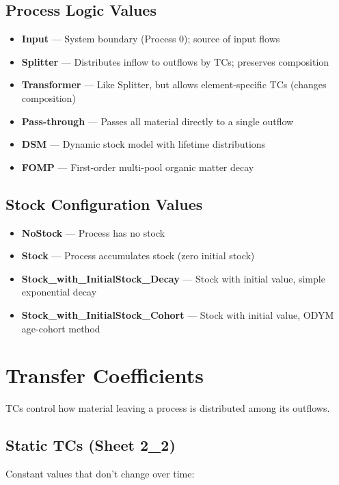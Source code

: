 \subsection{Process Logic Values}

\begin{itemize}
  \item \textbf{Input} --- System boundary (Process 0); source of input flows
  \item \textbf{Splitter} --- Distributes inflow to outflows by TCs; preserves composition
  \item \textbf{Transformer} --- Like Splitter, but allows element-specific TCs (changes composition)
  \item \textbf{Pass-through} --- Passes all material directly to a single outflow
  \item \textbf{DSM} --- Dynamic stock model with lifetime distributions
  \item \textbf{FOMP} --- First-order multi-pool organic matter decay
\end{itemize}

\subsection{Stock Configuration Values}

\begin{itemize}
  \item \textbf{NoStock} --- Process has no stock
  \item \textbf{Stock} --- Process accumulates stock (zero initial stock)
  \item \textbf{Stock\_with\_InitialStock\_Decay} --- Stock with initial value, simple exponential decay
  \item \textbf{Stock\_with\_InitialStock\_Cohort} --- Stock with initial value, ODYM age-cohort method
\end{itemize}

\section{Transfer Coefficients}

TCs control how material leaving a process is distributed among its outflows.

\subsection{Static TCs (Sheet 2\_2)}

Constant values that don't change over time:

